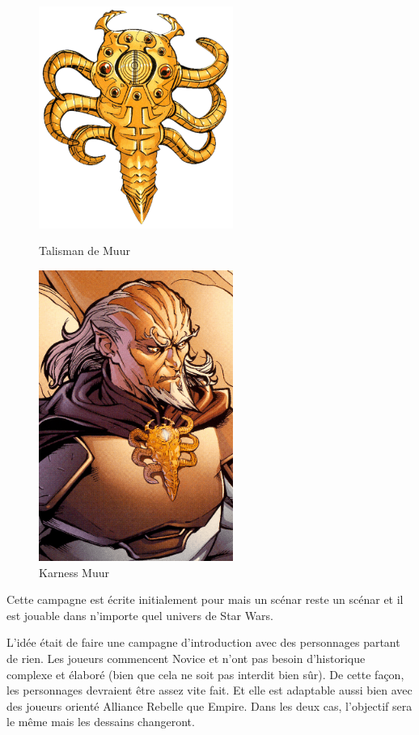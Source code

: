 \documentclass{jdrp}
\begin{document}
	\begin{figure}
		\centering
		\includegraphics[width=180pt]{_img/dos-au-muur/talisman.png}
		\caption{\label{fig:talisman-de-muur}Talisman de Muur}
		\vspace{1\baselineskip}
		\includegraphics[width=180pt]{_img/dos-au-muur/karness-muur.png}
		\caption{\label{fig:karness-muur}Karness Muur}
	\end{figure}
	
	Cette campagne est écrite initialement pour  mais un scénar reste un scénar et il est jouable dans n’importe quel univers de Star Wars.

	L’idée était de faire une campagne d’introduction avec des personnages partant de rien. Les joueurs commencent Novice et n’ont pas besoin d’historique complexe et élaboré (bien que cela ne soit pas interdit bien sûr). De cette façon, les personnages devraient être assez vite fait. Et elle est adaptable aussi bien avec des joueurs orienté Alliance Rebelle que Empire. Dans les deux cas, l’objectif sera le même mais les dessains changeront.
\end{document}

